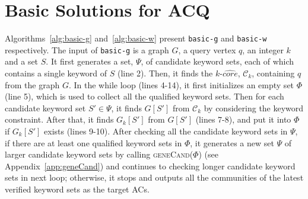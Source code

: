 \section{Basic Solutions for ACQ}
\label{app:basic}

Algorithms~\ref{alg:basic-g} and~\ref{alg:basic-w} present {\tt basic-g} and {\tt basic-w} respectively.
The input of {\tt basic-g} is a graph $G$, a query vertex $q$, an integer $k$ and a set $S$.
It first generates a set, $\Psi$, of candidate keyword sets,
each of which contains a single keyword of $S$ (line 2).
Then, it finds the $k$-$\widehat {core}$, ${\mathcal C}_k$, containing $q$ from the graph $G$.
In the while loop (lines 4-14), it first initializes an empty set $\Phi$ (line 5),
which is used to collect all the qualified keyword sets.
Then for each candidate keyword set $S'\in \Psi$,
it finds $G[S']$ from ${\mathcal C}_k$ by considering the keyword constraint.
After that, it finds $G_k[S']$ from $G[S']$ (lines 7-8),
and put it into $\Phi$ if $G_k[S']$ exists (lines 9-10).
After checking all the candidate keyword sets in $\Psi$,
if there are at least one qualified keyword sets in $\Phi$,
it generates a new set $\Psi$ of larger candidate keyword sets
by calling \textsc{geneCand($\Phi$)} (see Appendix~\ref{app:geneCand})
and continues to checking longer candidate keyword sets in next loop;
otherwise, it stops and outputs all the communities of the latest verified keyword sets as the target ACs.



